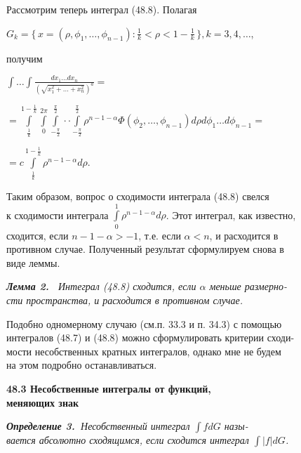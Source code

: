 ﻿\documentclass[twocolumn]{article}
\begin{document}
\hspace{5pt} Рассмотрим теперь интеграл (48.8). Полагая
\begin{center}
$G_k = \{\,x = (\rho,\phi_1,\ldots,\phi_{n-1}):\frac1k < \rho < 1 - \frac1k\,\}, k = 3,4,\ldots$,
\end{center}
получим
\begin{center}
$\int \ldots \int\frac{dx_1\ldots dx_n}{(\sqrt{x^2_1+\ldots +x^2_n})^a} = $
\end{center}
\begin{center}
$= \int\limits^{1-\frac1k}_{\frac1k}\int\limits_0^{2\pi}\int\limits_{-\frac{\pi}{2}}^{\frac{\pi}{2}}\cdot \cdot \int\limits_{-\frac{\pi}{2}}^{\frac{\pi}{2}}\rho^{n-1-\alpha}\Phi(\phi_2,\ldots,\phi_{n-1})d\rho d\phi_1\ldots d\phi_{n-1} =$
\end{center}
\begin{center}
$= c \int\limits^{1-\frac1k}_{\frac1k} \rho^{n-1-\alpha}d\rho$.
\end{center}
\hspace{5pt} Таким образом, вопрос о сходимости интеграла (48.8) свелся\\ к сходимости интеграла $\int\limits_0^1 \rho^{n-1-\alpha}d\rho$. Этот интеграл, как известно,\\ сходится, если $n - 1 - \alpha > -1$, т.е. если $\alpha < n$, и расходится в\\ противном случае. Полученный результат сформулируем снова в\\ виде леммы.

{\slshape{{\bfseries\slshape{Лемма 2.\ }}    \it Интеграл (48.8) сходится, если $\alpha$
меньше размерно-\\сти пространства, и расходится в противном случае.}}

Подобно одномерному случаю (см.п. 33.3 и п. 34.3) с помощью\\ интегралов (48.7) и (48.8) можно сформулировать 
критерии сходи-\\мости несобственных кратных интегралов, однако мне не будем\\ на этом подробно останавливаться.


\begin{flushleft}
{\small{\bfseries\hspace{30pt} 48.3 Несобственные интегралы от функций,\\
\hspace{30pt} меняющих знак}}
\end{flushleft}
{\slshape{\bfseries\slshape{\hspace{30pt} Определение 3.\ }}\it Несобственный интеграл $\int fdG $ назы-\\вается абсолютно сходящимся, если сходится интеграл $\int |f|dG $.}
\end{document}
